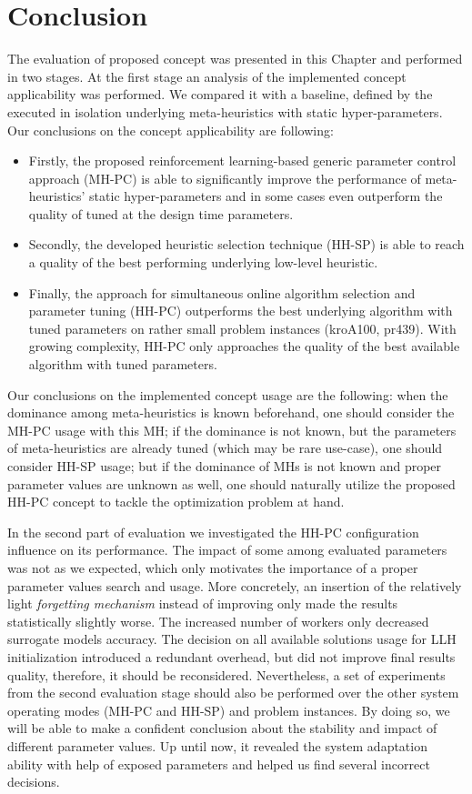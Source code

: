 \section{Conclusion}\label{eval: conclution}
The evaluation of proposed concept was presented in this Chapter and performed in two stages. At the first stage an analysis of the implemented concept applicability was performed. We compared it with a baseline, defined by the executed in isolation underlying meta-heuristics with static hyper-parameters. Our conclusions on the concept applicability are following:
\begin{itemize}
	\item Firstly, the proposed reinforcement learning-based generic parameter control approach (MH-PC) is able to significantly improve the performance of meta-heuristics' static hyper-parameters and in some cases even outperform the quality of tuned at the design time parameters.
	
	\item Secondly, the developed heuristic selection technique (HH-SP) is able to reach a quality of the best performing underlying low-level heuristic. 
	
	\item Finally, the approach for simultaneous online algorithm selection and parameter tuning (HH-PC) outperforms the best underlying algorithm with tuned parameters on rather small problem instances (kroA100, pr439). With growing complexity, HH-PC only approaches the quality of the best available algorithm with tuned parameters.
\end{itemize}

Our conclusions on the implemented concept usage are the following: when the dominance among meta-heuristics is known beforehand, one should consider the MH-PC usage with this MH; if the dominance is not known, but the parameters of meta-heuristics are already tuned (which may be rare use-case), one should consider HH-SP usage; but if the dominance of MHs is not known and proper parameter values are unknown as well, one should naturally utilize the proposed HH-PC concept to tackle the optimization problem at hand.


In the second part of evaluation we investigated the HH-PC configuration influence on its performance. The impact of some among evaluated parameters was not as we expected, which only motivates the importance of a proper parameter values search and usage. More concretely, an insertion of the relatively light \emph{forgetting mechanism} instead of improving only made the results statistically slightly worse. The increased number of workers only decreased surrogate models accuracy. The decision on all available solutions usage for LLH initialization introduced a redundant overhead, but did not improve final results quality, therefore, it should be reconsidered. Nevertheless, a set of experiments from the second evaluation stage should also be performed over the other system operating modes (MH-PC and HH-SP) and problem instances. By doing so, we will be able to make a confident conclusion about the stability and impact of different parameter values. Up until now, it revealed the system adaptation ability with help of exposed parameters and helped us find several incorrect decisions.